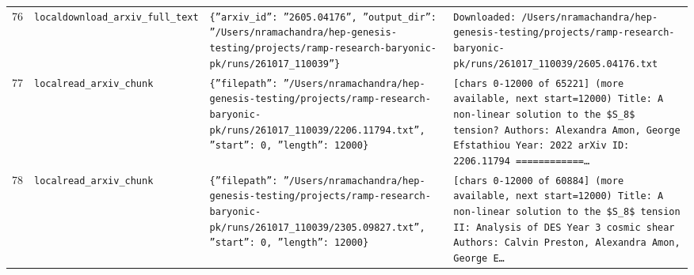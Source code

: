 \documentclass[11pt,a4paper]{article}
\begin{document}
\begin{longtable}{@{}p{}p{}p{}p{}@{}}
76 & \texttt{local}\newline\texttt{download\_\allowbreak{}arxiv\_\allowbreak{}full\_\allowbreak{}text} & \texttt{\{''arxiv\_\allowbreak{}id'':\allowbreak{} ''2605.04176'',\allowbreak{} ''output\_\allowbreak{}dir'':\allowbreak{} ''/\allowbreak{}Users/\allowbreak{}nramachandra/\allowbreak{}hep-genesis-testing/\allowbreak{}projects/\allowbreak{}ramp-research-baryonic-pk/\allowbreak{}runs/\allowbreak{}261017\_\allowbreak{}110039''\}\allowbreak{}} & \texttt{Downloaded:\allowbreak{} /\allowbreak{}Users/\allowbreak{}nramachandra/\allowbreak{}hep-genesis-testing/\allowbreak{}projects/\allowbreak{}ramp-research-baryonic-pk/\allowbreak{}runs/\allowbreak{}261017\_\allowbreak{}110039/\allowbreak{}2605.04176.txt} \\
77 & \texttt{local}\newline\texttt{read\_\allowbreak{}arxiv\_\allowbreak{}chunk} & \texttt{\{''filepath'':\allowbreak{} ''/\allowbreak{}Users/\allowbreak{}nramachandra/\allowbreak{}hep-genesis-testing/\allowbreak{}projects/\allowbreak{}ramp-research-baryonic-pk/\allowbreak{}runs/\allowbreak{}261017\_\allowbreak{}110039/\allowbreak{}2206.11794.txt'',\allowbreak{} ''start'':\allowbreak{} 0,\allowbreak{} ''length'':\allowbreak{} 12000\}\allowbreak{}} & \texttt{[chars 0-12000 of 65221]\allowbreak{} (more available,\allowbreak{} next start=\allowbreak{}12000)\allowbreak{}  Title:\allowbreak{} A non-linear solution to the \$S\_\allowbreak{}8\$ tension? Authors:\allowbreak{} Alexandra Amon,\allowbreak{} George Efstathiou Year:\allowbreak{} 2022 arXiv ID:\allowbreak{} 2206.11794  =\allowbreak{}=\allowbreak{}=\allowbreak{}=\allowbreak{}=\allowbreak{}=\allowbreak{}=\allowbreak{}=\allowbreak{}=\allowbreak{}=\allowbreak{}=\allowbreak{}=\allowbreak{}\ldots{}\allowbreak{}} \\
78 & \texttt{local}\newline\texttt{read\_\allowbreak{}arxiv\_\allowbreak{}chunk} & \texttt{\{''filepath'':\allowbreak{} ''/\allowbreak{}Users/\allowbreak{}nramachandra/\allowbreak{}hep-genesis-testing/\allowbreak{}projects/\allowbreak{}ramp-research-baryonic-pk/\allowbreak{}runs/\allowbreak{}261017\_\allowbreak{}110039/\allowbreak{}2305.09827.txt'',\allowbreak{} ''start'':\allowbreak{} 0,\allowbreak{} ''length'':\allowbreak{} 12000\}\allowbreak{}} & \texttt{[chars 0-12000 of 60884]\allowbreak{} (more available,\allowbreak{} next start=\allowbreak{}12000)\allowbreak{}  Title:\allowbreak{} A non-linear solution to the \$S\_\allowbreak{}8\$ tension II:\allowbreak{} Analysis of DES Year 3 cosmic shear Authors:\allowbreak{} Calvin Preston,\allowbreak{} Alexandra Amon,\allowbreak{} George E\ldots{}\allowbreak{}} \\

\end{longtable}
\end{document}
